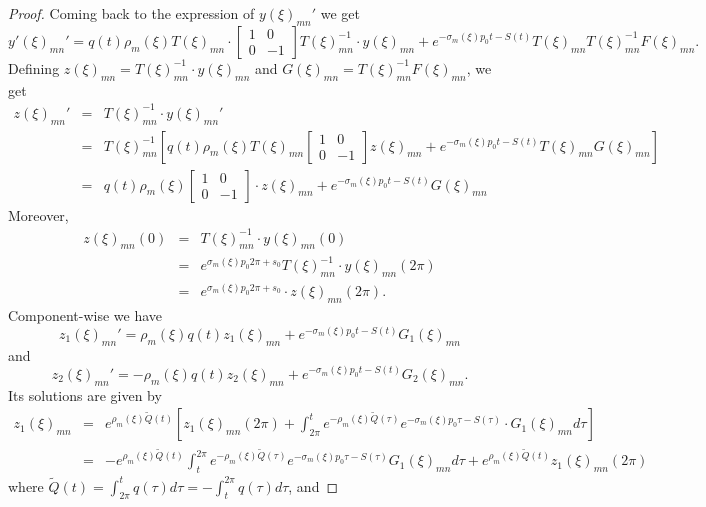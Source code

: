 \documentclass[sn-mathphys-num]{sn-jnl}%
\numberwithin{equation}{section}
\theoremstyle{thmstyleone}
\theoremstyle{thmstyletwo}
\theoremstyle{thmstylethree}
\begin{document}
\begin{proof}
Coming back to the expression of $y(\xi)_{mn}'$ we get
$$y'(\xi)_{mn}'=q(t)\rho_m(\xi)T(\xi)_{mn} \cdot \left[ \begin{array}{cr} 1 & 0 \\ 0 & -1 \end{array}  \right] T(\xi)_{mn}^{-1} \cdot y(\xi)_{mn}+e^{-\sigma_m(\xi)p_0 t-S(t)}T(\xi)_{mn}T(\xi)_{mn}^{-1} F(\xi)_{mn}.$$
Defining $z(\xi)_{mn}=T(\xi)_{mn}^{-1} \cdot y(\xi)_{mn}$ and $G(\xi)_{mn}=T(\xi)_{mn}^{-1}F(\xi)_{mn}$, we get
\begin{eqnarray*} z(\xi)_{mn}'& = & T(\xi)_{mn}^{-1}\cdot y(\xi)_{mn}'\\
	& = & T(\xi)_{mn}^{-1} \left[q(t)\rho_m(\xi) T(\xi)_{mn} \left[ \begin{array}{cr} 1 & 0 \\ 0 & -1 \end{array}  \right] z(\xi)_{mn}+e^{-\sigma_m(\xi)p_0 t-S(t)}T(\xi)_{mn} G(\xi)_{mn}  \right] \\
	& = & q(t)\rho_m(\xi) \left[ \begin{array}{cr} 1 & 0 \\ 0 & -1 \end{array}  \right] \cdot z(\xi)_{mn}+e^{-\sigma_m(\xi)p_0 t-S(t)}G(\xi)_{mn} 
\end{eqnarray*} 
Moreover,
\begin{eqnarray}\label{znobordo} z(\xi)_{mn}(0) & = & T(\xi)_{mn}^{-1}\cdot y(\xi)_{mn}(0) \nonumber \\
	& = & e^{\sigma_m(\xi)p_0 2\pi+s_0}T(\xi)_{mn}^{-1}\cdot y(\xi)_{mn}(2\pi) \nonumber \\
	& = & e^{\sigma_m(\xi)p_0 2\pi +s_0}\cdot z(\xi)_{mn}(2\pi).
\end{eqnarray}
Component-wise we have
$$z_1(\xi)_{mn}'=\rho_m(\xi)q(t)z_1(\xi)_{mn}+e^{-\sigma_m(\xi)p_0 t-S(t)}G_1(\xi)_{mn}$$
and
$$z_2(\xi)_{mn}'=-\rho_m(\xi)q(t)z_2(\xi)_{mn}+e^{-\sigma_m(\xi)p_0 t-S(t)}G_2(\xi)_{mn}.$$
Its solutions are given by
\begin{eqnarray*}
	z_1(\xi)_{mn}& = & e^{\rho_m(\xi)\widetilde{Q}(t)}\left[ z_1(\xi)_{mn}(2\pi)+\int_{2\pi}^t e^{-\rho_m(\xi)\widetilde{Q}(\tau)}e^{-\sigma_m(\xi)p_0 \tau -S(\tau)}\cdot G_1(\xi)_{mn}d\tau \right] \\
	& = & -e^{\rho_m(\xi)\widetilde{Q}(t)}\int_t^{2\pi}e^{-\rho_m(\xi)\widetilde{Q}(\tau)}e^{-\sigma_m(\xi)p_0 \tau -S(\tau)}G_1(\xi)_{mn}d\tau+e^{\rho_m(\xi)\widetilde{Q}(t)}z_1(\xi)_{mn}(2\pi)
\end{eqnarray*}
where $\widetilde{Q}(t)=\int_{2\pi}^t q(\tau)d\tau = -\int_{t}^{2\pi} q(\tau)d\tau$, and

\end{proof}
\end{document}

